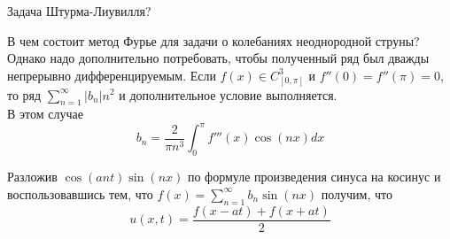 \documentclass{article}
\begin{document}
\begin{section}{Задача Штурма-Лиувилля?}
\begin{subsection}{В чем состоит метод Фурье для задачи о колебаниях неоднородной струны?}
Однако надо дополнительно потребовать, чтобы полученный ряд был дважды непрерывно дифференцируемым. Если $ f(x) \in C_{[0, \pi]}^3$ и $ f''(0)=f''(\pi)=0 $, то ряд $ \sum_{n=1}^{\infty} |b_n|n^2 $ и дополнительное условие выполняется.\\
В этом случае 
\[ b_n = \frac{2}{\pi n^3} \int_{0}^{\pi}f'''(x) \cos(nx)dx \]

Разложив $  \cos(ant)\sin(nx) $ по формуле произведения синуса на косинус и воспользовавшись тем, что $ f(x) = \sum_{n=1}^{\infty} b_n \sin(nx) $ получим, что
\[ u(x, t) = \frac{f(x-at) + f(x+at)}{2} \]
\end{subsection}

\end{section}
\end{document}
